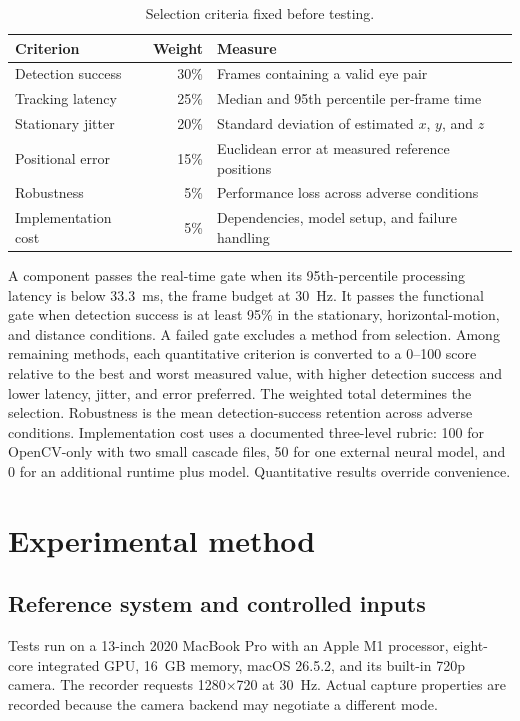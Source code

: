 \documentclass[9pt,a4paper,twocolumn]{article}
\begin{document}
\begin{table}[h]
\centering
\caption{Selection criteria fixed before testing.}
\label{tab:criteria}
\begin{tabularx}{\columnwidth}{@{}XrX@{}}
\toprule
Criterion & Weight & Measure\\
\midrule
Detection success & 30\% & Frames containing a valid eye pair\\
Tracking latency & 25\% & Median and 95th percentile per-frame time\\
Stationary jitter & 20\% & Standard deviation of estimated $x$, $y$, and $z$\\
Positional error & 15\% & Euclidean error at measured reference positions\\
Robustness & 5\% & Performance loss across adverse conditions\\
Implementation cost & 5\% & Dependencies, model setup, and failure handling\\
\bottomrule
\end{tabularx}
\end{table}

A component passes the real-time gate when its 95th-percentile processing latency is below 33.3~ms, the frame budget at 30~Hz. It passes the functional gate when detection success is at least 95\% in the stationary, horizontal-motion, and distance conditions. A failed gate excludes a method from selection. Among remaining methods, each quantitative criterion is converted to a 0--100 score relative to the best and worst measured value, with higher detection success and lower latency, jitter, and error preferred. The weighted total determines the selection. Robustness is the mean detection-success retention across adverse conditions. Implementation cost uses a documented three-level rubric: 100 for OpenCV-only with two small cascade files, 50 for one external neural model, and 0 for an additional runtime plus model. Quantitative results override convenience.

\section{Experimental method}

\subsection{Reference system and controlled inputs}

Tests run on a 13-inch 2020 MacBook Pro with an Apple M1 processor, eight-core integrated GPU, 16~GB memory, macOS 26.5.2, and its built-in 720p camera. The recorder requests 1280$\times$720 at 30~Hz. Actual capture properties are recorded because the camera backend may negotiate a different mode.
\end{document}
